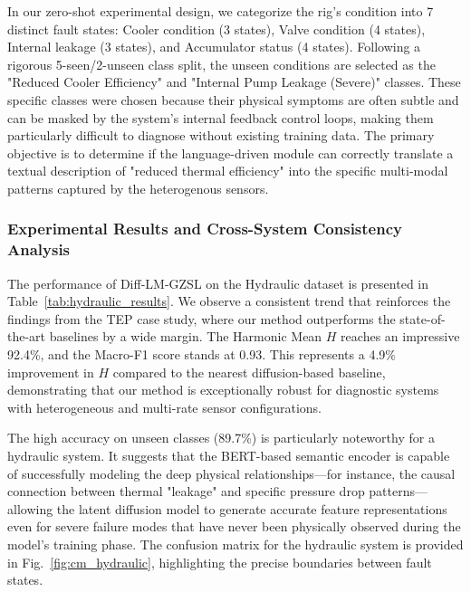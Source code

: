 In our zero-shot experimental design, we categorize the rig's condition into 7 distinct fault states: Cooler condition (3 states), Valve condition (4 states), Internal leakage (3 states), and Accumulator status (4 states). Following a rigorous 5-seen/2-unseen class split, the unseen conditions are selected as the "Reduced Cooler Efficiency" and "Internal Pump Leakage (Severe)" classes. These specific classes were chosen because their physical symptoms are often subtle and can be masked by the system's internal feedback control loops, making them particularly difficult to diagnose without existing training data. The primary objective is to determine if the language-driven module can correctly translate a textual description of "reduced thermal efficiency" into the specific multi-modal patterns captured by the heterogenous sensors.

\subsubsection{Experimental Results and Cross-System Consistency Analysis}
The performance of Diff-LM-GZSL on the Hydraulic dataset is presented in Table~\ref{tab:hydraulic_results}. We observe a consistent trend that reinforces the findings from the TEP case study, where our method outperforms the state-of-the-art baselines by a wide margin. The Harmonic Mean $H$ reaches an impressive 92.4\%, and the Macro-F1 score stands at 0.93. This represents a 4.9\% improvement in $H$ compared to the nearest diffusion-based baseline, demonstrating that our method is exceptionally robust for diagnostic systems with heterogeneous and multi-rate sensor configurations.

The high accuracy on unseen classes (89.7\%) is particularly noteworthy for a hydraulic system. It suggests that the BERT-based semantic encoder is capable of successfully modeling the deep physical relationships—for instance, the causal connection between thermal "leakage" and specific pressure drop patterns—allowing the latent diffusion model to generate accurate feature representations even for severe failure modes that have never been physically observed during the model's training phase. The confusion matrix for the hydraulic system is provided in Fig.~\ref{fig:cm_hydraulic}, highlighting the precise boundaries between fault states.

